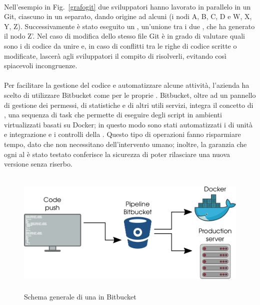    \paragraph*{} Nell'esempio in Fig.~\ref{grafogit} due sviluppatori hanno lavorato in parallelo in un  Git, ciascuno in un  separato, dando origine ad alcuni  (i nodi A, B, C, D e W, X, Y, Z). Successivamente è stato eseguito un , un'unione tra i due , che ha generato il nodo Z'. Nel caso di modifica dello stesso file Git è in grado di valutare quali sono i  di codice da unire e, in caso di conflitti tra le righe di codice scritte o modificate, lascerà agli sviluppatori il compito di risolverli, evitando così spiacevoli incongruenze.
   \paragraph*{}
   Per facilitare la gestione del codice e automatizzare alcune attività, l'azienda ha scelto di utilizzare Bitbucket come  per le proprie . Bitbucket, oltre ad un pannello di gestione dei permessi, di statistiche e di altri utili servizi, integra il concetto di , una sequenza di task che permette di eseguire degli script in ambienti virtualizzati basati su Docker; in questo modo sono stati automatizzati i  di unità e integrazione e i controlli della . Questo tipo di operazioni fanno risparmiare tempo, dato che non necessitano dell'intervento umano; inoltre, la garanzia che ogni  al  è stato testato conferisce la sicurezza di poter rilasciare una nuova versione senza riserbo.
   \begin{figure}[H]
      \begin{center}
         \includegraphics[width=15cm,height=6cm,keepaspectratio]{immagini/bitbucket-pipeline}
      \end{center}
      \caption{Schema generale di una  in Bitbucket}\label{pipelinebitbucket}
   \end{figure}
